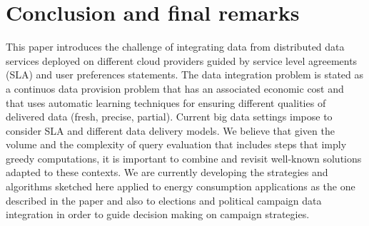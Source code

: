 \documentclass{llncs}
\begin{document}

\section{Conclusion and final remarks}\label{sec:conc}
This paper introduces the challenge of integrating data from distributed data services deployed on different cloud providers guided by service level agreements (SLA) and user preferences statements. The data integration problem is stated as a continuos data provision problem that has an associated economic cost and that uses automatic learning techniques for ensuring different qualities of delivered data (fresh, precise, partial).
Current big data settings impose to consider SLA and different data delivery models. We believe that given the volume and the complexity of query evaluation that includes steps that imply greedy computations, it is important to combine and revisit well-known solutions adapted to these contexts. We are currently developing the strategies and algorithms sketched here applied to energy consumption applications as the one described in the paper and also to elections and political campaign data integration in order to guide decision making on campaign strategies.



\end{document}
